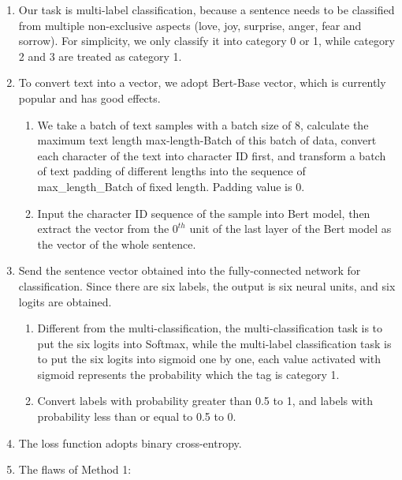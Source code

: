 \documentclass[12pt,twocolumn,letterpaper]{article}
\begin{document}
\begin{enumerate}
\begin{enumerate}
\item Our task is multi-label classification, because a sentence needs to be classified from multiple non-exclusive aspects (love, joy, surprise, anger, fear and sorrow). For simplicity, we only classify it into category 0 or 1, while category 2 and 3 are treated as category 1.  
\item To convert text into a vector, we adopt Bert-Base vector, which is currently popular and has good effects.  
\begin{enumerate}
\item We take a batch of text samples with a batch size of 8, calculate the maximum text length max-length-Batch of this batch of data, convert each character of the text into character ID first, and transform a batch of text padding of different lengths into the sequence of max\_length\_Batch of fixed length. Padding value is 0.  
\item Input the character ID sequence of the sample into Bert model, then extract the vector from the $0^{th}$ unit of the last layer of the Bert model as the vector of the whole sentence.  
\end{enumerate}
\item Send the sentence vector obtained into the fully-connected network for classification. Since there are six labels, the output is six neural units, and six logits are obtained.  
\begin{enumerate}
\item Different from the multi-classification, the multi-classification task is to put the six logits into Softmax, while the multi-label classification task is to put the six logits into sigmoid one by one, each value activated with sigmoid represents the probability which the tag is category 1.  
\item Convert labels with probability greater than 0.5 to 1, and labels with probability less than or equal to 0.5 to 0. 
\end{enumerate}
\item The loss function adopts binary cross-entropy.  

\item The flaws of Method 1:
\begin{enumerate}


\end{enumerate}
\end{enumerate}
\end{enumerate}
\end{document}
